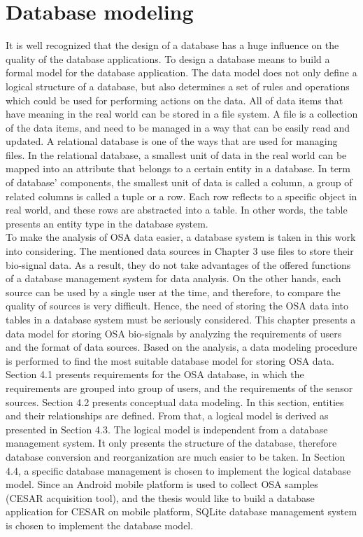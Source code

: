 \chapter{Database modeling}
It is well recognized that the design of a database has a huge influence on the quality of the database applications. To design a database means to build a formal model for the database application. The data model does not only define a logical structure of a database, but also determines a set of rules and operations which could be used for performing actions on the data. All of data items that have meaning in the real world can be stored in a file system. A file is a collection of the data items, and need to be managed in a way that can be easily read and updated. A relational database is one of the ways that are used for managing files. In the relational database, a smallest unit of data in the real world can be mapped into an attribute that belongs to a certain entity in a database. In term of database’ components, the smallest unit of data is called a column, a group of related columns is called a tuple or a row. Each row reflects to a specific object in real world, and these rows are abstracted into a table. In other words, the table presents an entity type in the database system.\\
To make the analysis of OSA data easier, a database system is taken in this work into considering. The mentioned data sources in Chapter 3 use files to store their bio-signal data. As a result, they do not take advantages of the offered functions of a database management system for data analysis. On the other hands, each source can be used by a single user at the time, and therefore, to compare the quality of sources is very difficult. Hence, the need of storing the OSA data into tables in a database system must be seriously considered.
This chapter presents a data model for storing OSA bio-signals by analyzing the requirements of users and the format of data sources. Based on the analysis, a data modeling procedure is performed to find the most suitable database model for storing OSA data.\\
Section 4.1 presents requirements for the OSA database, in which the requirements are grouped into group of users, and the requirements of the sensor sources. Section 4.2 presents conceptual data modeling. In this section, entities and their relationships are defined. From that, a logical model is derived as presented in Section 4.3. The logical model is independent from a database management system. It only presents the structure of the database, therefore database conversion and reorganization are much easier to be taken. In Section 4.4, a specific database management is chosen to implement the logical database model. Since an Android mobile platform is used to collect OSA samples (CESAR acquisition tool), and the thesis would like to build a database application for CESAR on mobile platform, SQLite database management system is chosen to implement the database model.
